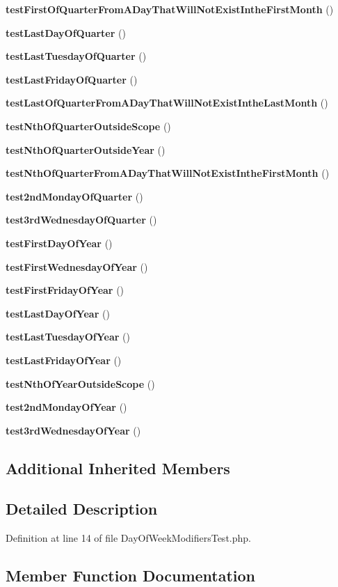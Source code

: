 \begin{DoxyCompactItemize}
{\bf test\+First\+Of\+Quarter\+From\+A\+Day\+That\+Will\+Not\+Exist\+Inthe\+First\+Month} ()
\item 
{\bf test\+Last\+Day\+Of\+Quarter} ()
\item 
{\bf test\+Last\+Tuesday\+Of\+Quarter} ()
\item 
{\bf test\+Last\+Friday\+Of\+Quarter} ()
\item 
{\bf test\+Last\+Of\+Quarter\+From\+A\+Day\+That\+Will\+Not\+Exist\+Inthe\+Last\+Month} ()
\item 
{\bf test\+Nth\+Of\+Quarter\+Outside\+Scope} ()
\item 
{\bf test\+Nth\+Of\+Quarter\+Outside\+Year} ()
\item 
{\bf test\+Nth\+Of\+Quarter\+From\+A\+Day\+That\+Will\+Not\+Exist\+Inthe\+First\+Month} ()
\item 
{\bf test2nd\+Monday\+Of\+Quarter} ()
\item 
{\bf test3rd\+Wednesday\+Of\+Quarter} ()
\item 
{\bf test\+First\+Day\+Of\+Year} ()
\item 
{\bf test\+First\+Wednesday\+Of\+Year} ()
\item 
{\bf test\+First\+Friday\+Of\+Year} ()
\item 
{\bf test\+Last\+Day\+Of\+Year} ()
\item 
{\bf test\+Last\+Tuesday\+Of\+Year} ()
\item 
{\bf test\+Last\+Friday\+Of\+Year} ()
\item 
{\bf test\+Nth\+Of\+Year\+Outside\+Scope} ()
\item 
{\bf test2nd\+Monday\+Of\+Year} ()
\item 
{\bf test3rd\+Wednesday\+Of\+Year} ()
\end{DoxyCompactItemize}
\subsection*{Additional Inherited Members}


\subsection{Detailed Description}


Definition at line 14 of file Day\+Of\+Week\+Modifiers\+Test.\+php.



\subsection{Member Function Documentation}
